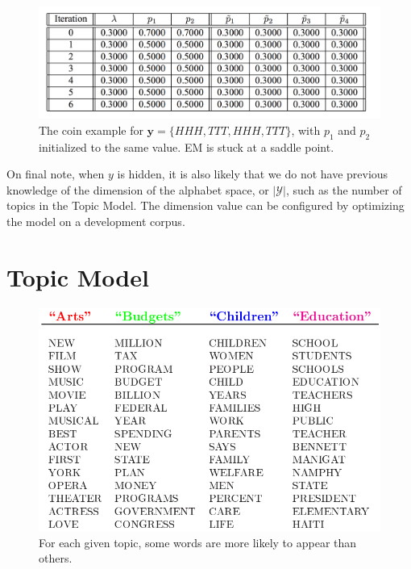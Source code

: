 \documentclass[justified, marginals=justified]{tufte-handout}
\theoremstyle{definition}
\begin{document}
\begin{figure}
	\includegraphics[width=\linewidth]{em-bad.png}
	\caption{The coin example for $\mathbf{y} = \{HHH, TTT, HHH, TTT\}$, with $p_1$ and $p_2$ initialized to the same value. EM is stuck at a saddle point. }
	\label{em-bad}
	\centering
\end{figure}

On final note, when $y$ is hidden, it is also likely that we do not have previous knowledge of the dimension of the alphabet space, or $|\mathcal{Y}|$, such as the number of topics in the Topic Model. The dimension value can be configured by optimizing the model on a development corpus.

\section{Topic Model}\label{sec:topic-model}

\begin{figure}
	\includegraphics[width=50ex]{topic-model-table.png}
	\caption{For each given topic, some words are more likely to appear than others.}
	\centering
\end{figure}

\end{document}
